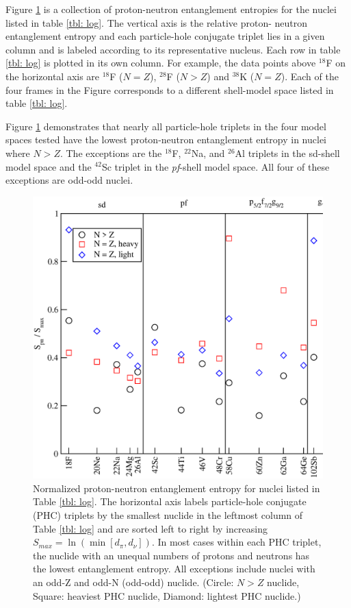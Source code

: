 Figure \ref{pns: all} is a collection of proton-neutron entanglement entropies
for the nuclei listed in table \ref{tbl: log}. The vertical axis is the relative proton-
neutron entanglement entropy and each particle-hole conjugate triplet lies in a 
given column and is labeled according to its representative nucleus. Each row in 
table \ref{tbl: log} is plotted in its own column. For example, the data points
above $^{18}$F on the horizontal axis are $^{18}$F ($N=Z$), $^{28}$F ($N>Z$) and $^{38}$K ($N=Z$).
Each of the four frames in the Figure corresponds to a different shell-model space
listed in table \ref{tbl: log}.

Figure \ref{pns: all} demonstrates that nearly all particle-hole triplets in the 
four model spaces tested have the lowest proton-neutron entanglement entropy in
nuclei where $N>Z$. The exceptions are the $^{18}$F, $^{22}$Na, and $^{26}$Al triplets in the 
sd-shell model space and the $^{42}$Sc triplet in the \textit{pf}-shell model space.
All four of these exceptions are odd-odd nuclei. 

\begin{figure}
    \centering    
    \includegraphics[width=.75\textwidth,clip]{Figures/s_gs_full}
    \caption{Normalized proton-neutron entanglement entropy for nuclei listed in 
Table \ref{tbl: log}. The horizontal axis
labels particle-hole conjugate (PHC) triplets by the smallest nuclide in the 
leftmost column of Table \ref{tbl: log} and are sorted left to right by increasing 
\boldmath$S_{max}=\ln(\min[d_\pi,d_\nu])$.  In most cases within each PHC triplet, the nuclide with an unequal 
numbers of protons and neutrons has the lowest entanglement entropy. All exceptions include
nuclei with an odd-Z and odd-N (odd-odd) nuclide. (Circle: $N>Z$ nuclide, Square: heaviest PHC nuclide,
Diamond: lightest PHC nuclide.)}
    \label{pns: all}
\end{figure}

